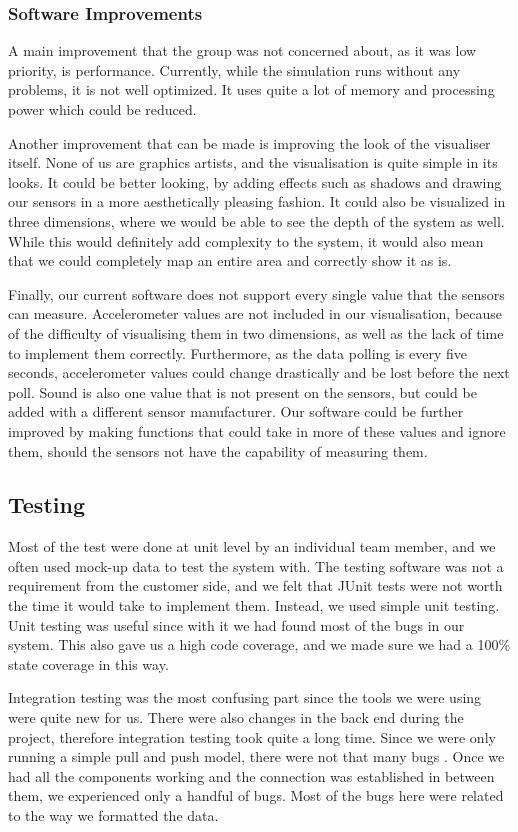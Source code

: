 \documentclass[../document]{subfiles}
\begin{document}
\subsubsection{Software Improvements}
A main improvement that the group was not concerned about, as it was low priority, is performance. Currently, while the simulation runs without any problems, it is not well optimized. It uses quite a lot of memory and processing power which could be reduced.

Another improvement that can be made is improving the look of the visualiser itself. None of us are graphics artists, and the visualisation is quite simple in its looks. It could be better looking, by adding effects such as shadows and drawing our sensors in a more aesthetically pleasing fashion. It could also be visualized in three dimensions, where we would be able to see the depth of the system as well. While this would definitely add complexity to the system, it would also mean that we could completely map an entire area and correctly show it as is.

Finally, our current software does not support every single value that the sensors can measure. Accelerometer values are not included in our visualisation, because of the difficulty of visualising them in two dimensions, as well as the lack of time to implement them correctly. Furthermore, as the data polling is every five seconds, accelerometer values could change drastically and be lost before the next poll. Sound is also one value that is not present on the sensors, but could be added with a different sensor manufacturer. Our software could be further improved by making functions that could take in more of these values and ignore them, should the sensors not have the capability of measuring them.

\subsection{Testing}
Most of the test were done at unit level by an individual team member, and we often used mock-up data to test the system with. The testing software was not a requirement from the customer side, and we felt that JUnit tests were not worth the time it would take to implement them. Instead, we used simple unit testing. Unit testing was useful since with it we had found most of the bugs in our system. This also gave us a high code coverage, and we made sure we had a 100\% state coverage in this way.

Integration testing was the most confusing part since the tools we were using were quite new for us. There were also changes in the back end during the project, therefore integration testing took quite a long time. Since we were only running a simple pull and push model, there were not that many bugs . Once we had all the components working and the connection was established in between them, we experienced only a handful of bugs. Most of the bugs here were related to the way we formatted the data.
\end{document}
